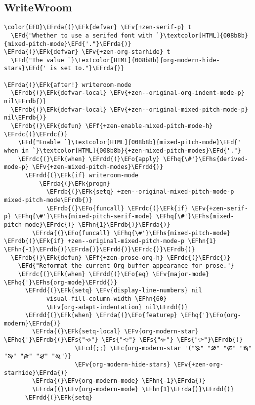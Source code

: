 \documentclass{article}
\newcommand{\EFc}[1]{\textcolor{EFc}{#1}} %
\newcommand{\EFcd}[1]{\textcolor{EFcd}{#1}} %
\newcommand{\EFs}[1]{\textcolor{EFs}{#1}} %
\newcommand{\EFd}[1]{\textcolor{EFd}{#1}} %
\newcommand{\EFk}[1]{\textcolor{EFk}{#1}} %
\newcommand{\EFf}[1]{\textcolor{EFf}{#1}} %
\newcommand{\EFv}[1]{\textcolor{EFv}{#1}} %
\newcommand{\EFo}[1]{\textcolor{EFo}{#1}} %
\newcommand{\EFhn}[1]{\textcolor{EFhn}{\textbf{#1}}} %
\newcommand{\EFhq}[1]{#1} %
\newcommand{\EFhs}[1]{\textcolor{EFhs}{#1}} %
\newcommand{\EFrda}[1]{\textcolor{EFrda}{#1}} %
\newcommand{\EFrdb}[1]{\textcolor{EFrdb}{#1}} %
\newcommand{\EFrdc}[1]{\textcolor{EFrdc}{#1}} %
\newcommand{\EFrdd}[1]{\textcolor{EFrdd}{#1}} %
\begin{document}
\subsection{WriteWroom}
\label{sec:org6356658}
\begin{Code}
\begin{Verbatim}
\color{EFD}\EFrda{(}\EFk{defvar} \EFv{+zen-serif-p} t
  \EFd{"Whether to use a serifed font with `}\textcolor[HTML]{008b8b}{mixed-pitch-mode}\EFd{'."}\EFrda{)}
\EFrda{(}\EFk{defvar} \EFv{+zen-org-starhide} t
  \EFd{"The value `}\textcolor[HTML]{008b8b}{org-modern-hide-stars}\EFd{' is set to."}\EFrda{)}

\EFrda{(}\EFk{after!} writeroom-mode
  \EFrdb{(}\EFk{defvar-local} \EFv{+zen--original-org-indent-mode-p} nil\EFrdb{)}
  \EFrdb{(}\EFk{defvar-local} \EFv{+zen--original-mixed-pitch-mode-p} nil\EFrdb{)}
  \EFrdb{(}\EFk{defun} \EFf{+zen-enable-mixed-pitch-mode-h} \EFrdc{(}\EFrdc{)}
    \EFd{"Enable `}\textcolor[HTML]{008b8b}{mixed-pitch-mode}\EFd{' when in `}\textcolor[HTML]{008b8b}{+zen-mixed-pitch-modes}\EFd{'."}
    \EFrdc{(}\EFk{when} \EFrdd{(}\EFo{apply} \EFhq{\#'}\EFhs{derived-mode-p} \EFv{+zen-mixed-pitch-modes}\EFrdd{)}
      \EFrdd{(}\EFk{if} writeroom-mode
          \EFrda{(}\EFk{progn}
            \EFrdb{(}\EFk{setq} +zen--original-mixed-pitch-mode-p mixed-pitch-mode\EFrdb{)}
            \EFrdb{(}\EFo{funcall} \EFrdc{(}\EFk{if} \EFv{+zen-serif-p} \EFhq{\#'}\EFhs{mixed-pitch-serif-mode} \EFhq{\#'}\EFhs{mixed-pitch-mode}\EFrdc{)} \EFhn{1}\EFrdb{)}\EFrda{)}
        \EFrda{(}\EFo{funcall} \EFhq{\#'}\EFhs{mixed-pitch-mode} \EFrdb{(}\EFk{if} +zen--original-mixed-pitch-mode-p \EFhn{1} \EFhn{-1}\EFrdb{)}\EFrda{)}\EFrdd{)}\EFrdc{)}\EFrdb{)}
  \EFrdb{(}\EFk{defun} \EFf{+zen-prose-org-h} \EFrdc{(}\EFrdc{)}
    \EFd{"Reformat the current Org buffer appearance for prose."}
    \EFrdc{(}\EFk{when} \EFrdd{(}\EFo{eq} \EFv{major-mode} \EFhq{'}\EFhs{org-mode}\EFrdd{)}
      \EFrdd{(}\EFk{setq} \EFv{display-line-numbers} nil
            visual-fill-column-width \EFhn{60}
            \EFv{org-adapt-indentation} nil\EFrdd{)}
      \EFrdd{(}\EFk{when} \EFrda{(}\EFo{featurep} \EFhq{'}\EFo{org-modern}\EFrda{)}
        \EFrda{(}\EFk{setq-local} \EFv{org-modern-star} \EFhq{'}\EFrdb{(}\EFs{"🙘"} \EFs{"🙙"} \EFs{"🙚"} \EFs{"🙛"}\EFrdb{)}
                    \EFcd{;;} \EFc{org-modern-star '("🙐" "🙑" "🙒" "🙓" "🙔" "🙕" "🙖" "🙗")}
                    \EFv{org-modern-hide-stars} \EFv{+zen-org-starhide}\EFrda{)}
        \EFrda{(}\EFv{org-modern-mode} \EFhn{-1}\EFrda{)}
        \EFrda{(}\EFv{org-modern-mode} \EFhn{1}\EFrda{)}\EFrdd{)}
      \EFrdd{(}\EFk{setq}

\end{Verbatim}
\end{Code}
\end{document}

